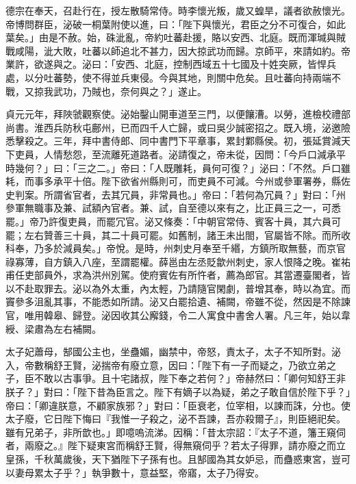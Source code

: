 \begin{pinyinscope}
 德宗在奉天，召赴行在，授左散騎常侍。時李懷光叛，歲又蝗旱，議者欲赦懷光。帝博問群臣，泌破一桐葉附使以進，曰：「陛下與懷光，君臣之分不可復合，如此葉矣。」由是不赦。始，硃泚亂，帝約吐蕃赴援，賂以安西、北庭。既而渾瑊與賊戰咸陽，泚大敗，吐蕃以師追北不甚力，因大掠武功而歸。京師平，來請如約。帝業許，欲遂與之。泌曰：「安西、北庭，控制西域五十七國及十姓突厥，皆悍兵處，以分吐蕃勢，使不得並兵東侵。今與其地，則關中危矣。且吐蕃向持兩端不戰，又掠我武功，乃賊也，奈何與之？」遂止。



 貞元元年，拜陜虢觀察使。泌始鑿山開車道至三門，以便饟漕。以勞，進檢校禮部尚書。淮西兵防秋屯鄜州，已而四千人亡歸，或曰吳少誠密招之。既入境，泌邀險悉擊殺之。三年，拜中書侍郎、同中書門下平章事，累封鄴縣侯。初，張延賞減天下吏員，人情愁怨，至流離死道路者。泌請復之，帝未從，因問：「今戶口減承平時幾何？」曰：「三之二。」帝曰：「人既雕耗，員何可復？」泌曰：「不然。戶口雖耗，而事多承平十倍。陛下欲省州縣則可，而吏員不可減。今州或參軍署券，縣佐史判案。所謂省官者，去其冗員，非常員也。」帝曰：「若何為冗員？」對曰：「州參軍無職事及兼、試額內官者。兼、試，自至德以來有之，比正員三之一，可悉罷。」帝乃許復吏員，而罷冗官。泌又條奏：「中朝官常侍、賓客十員，其六員可罷；左右贊善三十員，其二十員可罷。如舊制，諸王未出閤，官屬皆不除。而所收科奉，乃多於減員矣。」帝悅。是時，州刺史月奉至千緡，方鎮所取無藝，而京官祿寡薄，自方鎮入八座，至謂罷權。薛邕由左丞貶歙州刺史，家人恨降之晚。崔祐甫任吏部員外，求為洪州別駕。使府賓佐有所忤者，薦為郎官。其當遷臺閣者，皆以不赴取罪去。泌以為外太重，內太輕，乃請隨官閑劇，普增其奉，時以為宜。而竇參多沮亂其事，不能悉如所請。泌又白罷拾遺、補闕，帝雖不從，然因是不除諫官，唯用韓皋、歸登。泌因收其公廨錢，令二人寓食中書舍人署。凡三年，始以韋綬、梁肅為左右補闕。



 太子妃蕭母，郜國公主也，坐蠱媚，幽禁中，帝怒，責太子，太子不知所對。泌入，帝數稱舒王賢，泌揣帝有廢立意，因曰：「陛下有一子而疑之，乃欲立弟之子，臣不敢以古事爭。且十宅諸叔，陛下奉之若何？」帝赫然曰：「卿何知舒王非朕子？」對曰：「陛下昔為臣言之。陛下有嫡子以為疑，弟之子敢自信於陛下乎？」帝曰：「卿違朕意，不顧家族邪？」對曰：「臣衰老，位宰相，以諫而誅，分也。使太子廢，它日陛下悔曰『我惟一子殺之，泌不吾諫，吾亦殺爾子』，則臣絕祀矣。雖有兄弟子，非所歆也。」即噫嗚流涕。因稱：「昔太宗詔：『太子不道，籓王窺伺者，兩廢之。』陛下疑東宮而稱舒王賢，得無窺伺乎？若太子得罪，請亦廢之而立皇孫，千秋萬歲後，天下猶陛下子孫有也。且郜國為其女妒忌，而蠱惑東宮，豈可以妻母累太子乎？」執爭數十，意益堅，帝寤，太子乃得安。




\end{pinyinscope}
